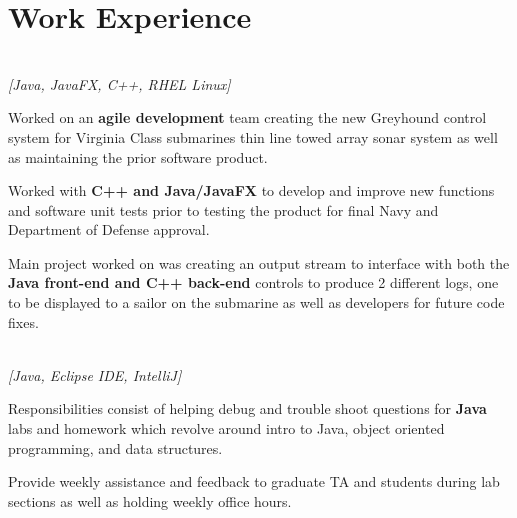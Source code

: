 \documentclass[letterpaper]{deedy-resume}
\begin{document}
\begin{minipage}[t]{0.69\textwidth} 

\section{Work Experience}

 \\  \emph{[Java, JavaFX, C++, RHEL Linux]}\\

\vspace{\topsep} 
\begin{tightitemize}
\item Worked on an \textbf{agile development} team creating the new Greyhound control system for Virginia Class submarines thin line towed array sonar system as well as maintaining the prior software product.
\item Worked with \textbf{C++ and Java/JavaFX} to develop and improve new functions and software unit tests prior to testing the product for final Navy and Department of Defense approval. 
\item Main project worked on was creating an output stream to interface with both the \textbf{Java front-end and C++ back-end} controls to produce 2 different logs, one to be displayed to a sailor on the submarine as well as developers for future code fixes.
\end{tightitemize}

\sectionspace

 \\
 \color{gray} \emph{[Java, Eclipse IDE, IntelliJ]}\\

\vspace{\topsep} 
\begin{tightitemize}
\item Responsibilities consist of helping debug and trouble shoot questions for \textbf{Java} labs and homework which revolve around intro to Java, object oriented programming, and data structures.
\item Provide weekly assistance and feedback to graduate TA and students during lab sections as well as holding weekly office hours.
\end{tightitemize}



\end{minipage}
\end{document}
